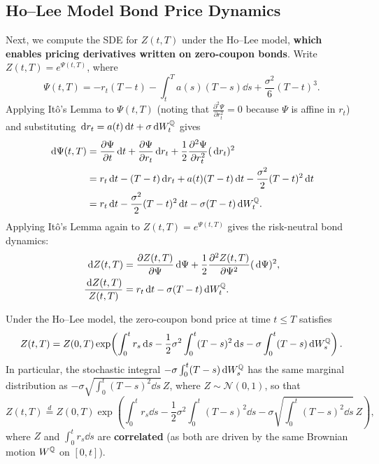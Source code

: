 \subsection*{Ho--Lee Model Bond Price Dynamics}
Next, we compute the SDE for $Z(t, T)$ under the Ho--Lee model, \textbf{which enables pricing derivatives written on zero-coupon bonds}. Write $Z(t, T) = e^{\Psi(t, T)}$, where
\[
\Psi(t, T) = -r_t(T - t) - \int_t^T a(s)(T - s)\dd s + \frac{\sigma^2}{6}(T - t)^3.
\]
Applying It\^o's Lemma to $\Psi(t, T)$ (noting that $\frac{\partial^2 \Psi}{\partial r_t^2} = 0$ because $\Psi$ is affine in $r_t$) and substituting $\,\mathrm{d} r_t = a(t)\,\mathrm{d} t + \sigma\,\mathrm{d} W_t^{\mathbb{Q}}$ gives
\begin{align*}
\,\mathrm{d}\Psi(t, T) &= \frac{\partial \Psi}{\partial t}\,\mathrm{d} t + \frac{\partial \Psi}{\partial r_t}\,\mathrm{d} r_t + \frac{1}{2}\frac{\partial^2 \Psi}{\partial r_t^2}(\,\mathrm{d} r_t)^2 \\
&= r_t\,\mathrm{d} t - (T - t)\,\mathrm{d} r_t + a(t)(T - t)\,\mathrm{d} t - \frac{\sigma^2}{2}(T - t)^2\,\mathrm{d} t \\
&= r_t\,\mathrm{d} t - \frac{\sigma^2}{2}(T - t)^2\,\mathrm{d} t - \sigma(T - t)\,\mathrm{d} W_t^{\mathbb{Q}}.
\end{align*}
Applying It\^o's Lemma again to $Z(t, T) = e^{\Psi(t, T)}$ gives the risk-neutral bond dynamics:
\begin{align*}
\,\mathrm{d} Z(t, T) &= \frac{\partial Z(t, T)}{\partial \Psi}\,\mathrm{d}\Psi + \frac{1}{2}\frac{\partial^2 Z(t, T)}{\partial \Psi^2}(\,\mathrm{d}\Psi)^2, \\
\frac{\,\mathrm{d} Z(t, T)}{Z(t, T)} &= r_t\,\mathrm{d} t - \sigma(T - t)\,\mathrm{d} W_t^{\mathbb{Q}}.
\end{align*}

\begin{proposition}\label{prop:ho-lee-bond}
    Under the Ho--Lee model, the zero-coupon bond price at time $t \leq T$ satisfies
    \[
    Z(t, T) = Z(0, T)\exp\!\left(\int_0^t r_s\,\mathrm{d} s - \frac{1}{2}\sigma^2 \int_0^t (T - s)^2\,\mathrm{d} s - \sigma\int_0^t (T - s)\,\mathrm{d} W_s^{\mathbb{Q}}\right).
    \]
    In particular, the stochastic integral $-\sigma\int_0^t (T - s)\,\mathrm{d} W_s^{\mathbb{Q}}$ has the same marginal distribution as $-\sigma\sqrt{\int_0^t (T - s)^2\dd s}\,Z$, where $Z \sim \mathcal{N}(0, 1)$, so that
    \[
    Z(t, T) \stackrel{d}{=} Z(0, T)\exp\!\left(\int_0^t r_s\dd s - \frac{1}{2}\sigma^2 \int_0^t (T - s)^2\dd s - \sigma\sqrt{\int_0^t (T - s)^2\dd s}\,Z\right),
    \]
    where $Z$ and $\int_0^t r_s\dd s$ are \textbf{correlated} (as both are driven by the same Brownian motion $W^{\mathbb{Q}}$ on $[0, t]$).
\end{proposition}

